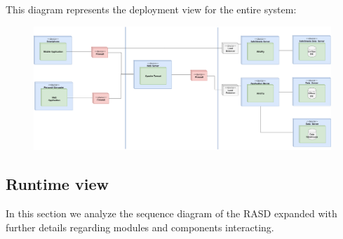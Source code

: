 \documentclass[12pt,a4paper]{article}
\begin{document}
\newpage
This diagram represents the deployment view for the entire system:
\begin{figure}[H]
\begin{adjustwidth}{-25mm}{-25mm}
				\centering				
					        \includegraphics[width=0.9\paperwidth]{Images/deploymentView}
\end{adjustwidth}
			\end{figure}
\newpage
\subsection{Runtime view}
In this section we analyze the sequence diagram of the RASD expanded with further details regarding modules and components interacting.
\end{document}
